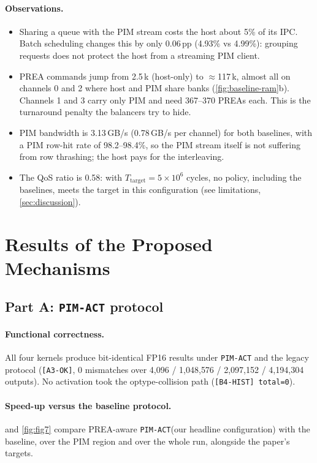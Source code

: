 \documentclass[conference]{IEEEtran}
\newcommand{\cmd}[1]{\texttt{\footnotesize #1}}
\newcommand{\pimact}{\cmd{PIM-ACT}\xspace}
\begin{document}
\paragraph{Observations.}
\begin{itemize}
\item Sharing a queue with the PIM stream costs the host about 5\% of its IPC. Batch scheduling changes this by only 0.06\,pp (4.93\% vs 4.99\%): grouping requests does not protect the host from a streaming PIM client.
\item PREA commands jump from 2.5\,k (host-only) to $\approx$117\,k, almost all on channels 0 and 2 where host and PIM share banks (\cref{fig:baseline-ram}b). Channels 1 and 3 carry only PIM and need 367--370 PREAs each. This is the turnaround penalty the balancers try to hide.
\item PIM bandwidth is 3.13\,GB/s (0.78\,GB/s per channel) for both baselines, with a PIM row-hit rate of 98.2--98.4\%, so the PIM stream itself is not suffering from row thrashing; the host pays for the interleaving.
\item The QoS ratio is 0.58: with $T_{\mathrm{target}}=5\times10^6$ cycles, no policy, including the baselines, meets the target in this configuration (see limitations, \cref{sec:discussion}).
\end{itemize}

\section{Results of the Proposed Mechanisms}\label{sec:results}

\subsection{Part A: \pimact protocol}

\paragraph{Functional correctness.} All four kernels produce bit-identical FP16 results under \pimact and the legacy protocol (\cmd{[A3-OK]}, 0 mismatches over 4{,}096 / 1{,}048{,}576 / 2{,}097{,}152 / 4{,}194{,}304 outputs). No activation took the optype-collision path (\cmd{[B4-HIST] total=0}).

\paragraph{Speed-up versus the baseline protocol.}  and \cref{fig:fig7} compare PREA-aware \pimact (our headline configuration) with the baseline, over the PIM region and over the whole run, alongside the paper's targets.
\end{document}
